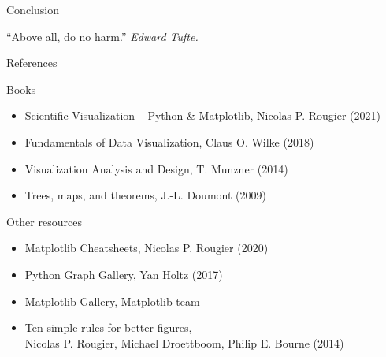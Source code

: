 \documentclass[10pt,aspectratio=169]{beamer}
\begin{document}



\begin{frame}{Conclusion}

  \begin{center}
    ``Above all, do no harm.''
    {\em Edward Tufte.}
  \end{center}
\end{frame}

  
\begin{frame}{References}

  \begin{block}{Books}
    \vspace{0pt}
    \begin{itemize}
    \item Scientific Visualization – Python \& Matplotlib,
          Nicolas P. Rougier (2021)
    \item Fundamentals of Data Visualization,
          Claus O. Wilke (2018)
    \item Visualization Analysis and Design, T. Munzner (2014)
    \item Trees, maps, and theorems, J.-L. Doumont (2009)
    \end{itemize}
  \end{block}

  \begin{block}{Other resources}
    \vspace{0pt}
    \begin{itemize}
      \item Matplotlib Cheatsheets, Nicolas P. Rougier (2020)
      \item Python Graph Gallery, Yan Holtz (2017)
      \item Matplotlib Gallery, Matplotlib team
      \item Ten simple rules for better figures,\\
            Nicolas P. Rougier, Michael Droettboom, Philip E. Bourne (2014)
    \end{itemize}
  \end{block}
    
\end{frame}
\end{document}
